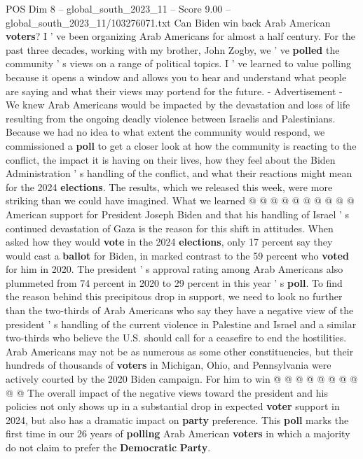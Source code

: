 \begin{textsample}{POS Dim 8 – global\_south\_2023\_11 – Score 9.00 – global\_south\_2023\_11/103276071.txt}  \label{ex:f8_pos_270}
Can Biden win back Arab American \textbf{voters}?
I ' ve been organizing Arab Americans for almost a half century.
For the past three decades, working with my brother, John Zogby, we ' ve \textbf{polled} the community ' s views on a range of political topics.
I ' ve learned to value polling because it opens a window and allows you to hear and understand what people are saying and what their views may portend for the future. - Advertisement - We knew Arab Americans would be impacted by the devastation and loss of life resulting from the ongoing deadly violence between Israelis and Palestinians.
Because we had no idea to what extent the community would respond, we commissioned a \textbf{poll} to get a closer look at how the community is reacting to the conflict, the impact it is having on their lives, how they feel about the Biden Administration ' s handling of the conflict, and what their reactions might mean for the 2024 \textbf{elections}.
The results, which we released this week, were more striking than we could have imagined.
What we learned @ @ @ @ @ @ @ @ @ @ American support for President Joseph Biden and that his handling of Israel ' s continued devastation of Gaza is the reason for this shift in attitudes.
When asked how they would \textbf{vote} in the 2024 \textbf{elections}, only 17 percent say they would cast a \textbf{ballot} for Biden, in marked contrast to the 59 percent who \textbf{voted} for him in 2020.
The president ' s approval rating among Arab Americans also plummeted from 74 percent in 2020 to 29 percent in this year ' s \textbf{poll}.
To find the reason behind this precipitous drop in support, we need to look no further than the two-thirds of Arab Americans who say they have a negative view of the president ' s handling of the current violence in Palestine and Israel and a similar two-thirds who believe the U.S. should call for a ceasefire to end the hostilities.
Arab Americans may not be as numerous as some other constituencies, but their hundreds of thousands of \textbf{voters} in Michigan, Ohio, and Pennsylvania were actively courted by the 2020 Biden campaign.
For him to win @ @ @ @ @ @ @ @ @ @ The overall impact of the negative views toward the president and his policies not only shows up in a substantial drop in expected \textbf{voter} support in 2024, but also has a dramatic impact on \textbf{party} preference.
This \textbf{poll} marks the first time in our 26 years of \textbf{polling} Arab American \textbf{voters} in which a majority do not claim to prefer the \textbf{Democratic} \textbf{Party}.

\end{textsample}
